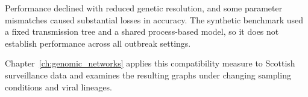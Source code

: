 Performance declined with reduced genetic resolution, and some parameter mismatches caused substantial losses in accuracy. The synthetic benchmark used a fixed transmission tree and a shared process-based model, so it does not establish performance across all outbreak settings.

Chapter~\ref{ch:genomic_networks} applies this compatibility measure to Scottish surveillance data and examines the resulting graphs under changing sampling conditions and viral lineages.
